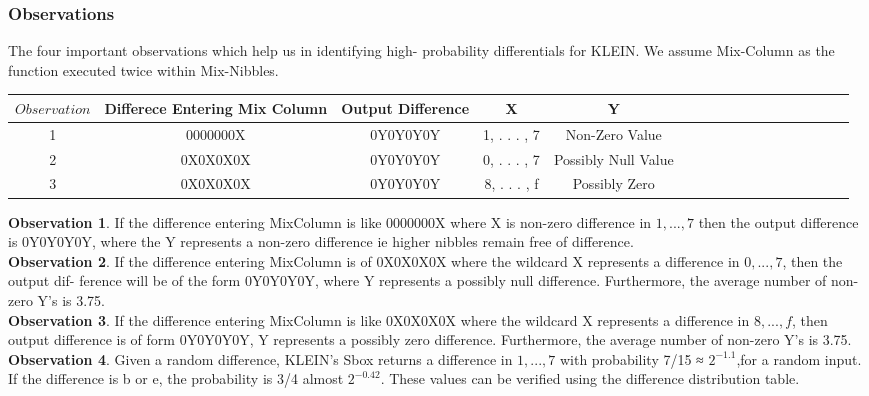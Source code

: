 \documentclass[preprint]{transcrypto}
\begin{document}
\subsubsection{Observations}
The four important observations which help us in identifying high-
probability differentials for KLEIN. We assume Mix-Column as the function executed twice within Mix-Nibbles.


\begin{center}
\begin{tabular}{|c|c|c|c|c|c|c|c|c|c|c|c|c|c|c|c|c|}
\hline
$Observation$ &Differece Entering Mix Column&Output Difference&X&Y\\
\hline
1 & 0000000X  & 0Y0Y0Y0Y & {1, . . . , 7} & Non-Zero Value\\
\hline
2 & 0X0X0X0X & 0Y0Y0Y0Y& {0, . . . , 7} & Possibly Null Value\\
\hline
3 & 0X0X0X0X & 0Y0Y0Y0Y& {8, . . . , f} & Possibly Zero\\
\hline
\end{tabular}
\end{center}

\textbf{Observation 1}. If the difference entering MixColumn is like 0000000X
where X is non-zero difference in ${1, . . . , 7}$ then the output difference is 0Y0Y0Y0Y, where the Y
represents a non-zero difference ie higher nibbles remain free of difference.\\
\textbf{Observation 2}. If the difference entering MixColumn is of  0X0X0X0X
where the wildcard X represents a difference in ${0, . . . , 7}$, then the output dif-
ference will be of the form 0Y0Y0Y0Y, where Y represents a possibly null difference.
Furthermore, the average number of non-zero Y’s is 3.75.\\
\textbf{Observation 3}. If the difference entering MixColumn is like 0X0X0X0X where the wildcard X represents a difference in ${8, . . . , f}$, then output difference is of form 0Y0Y0Y0Y, Y represents a possibly zero difference. Furthermore, the average number of non-zero Y’s is 3.75.\\
\textbf{Observation 4}. Given a random difference, KLEIN’s Sbox returns a difference in ${1, . . . , 7}$ with probability 7/15 ≈ $2^{−1.1}$,for a random input. If the difference is b or e, the probability is 3/4 almost $2^{−0.42}$. These values can be verified using the difference distribution table.\\
\end{document}
